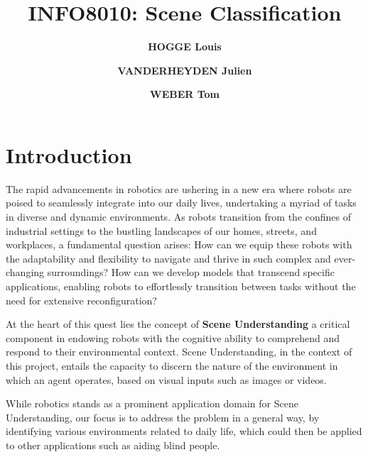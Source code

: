 \documentclass[twocolumn,superscriptaddress,aps]{revtex4-1}
\begin{document}

\title{\Large{INFO8010: Scene Classification}}
\vspace{1cm}
\author{\small{\bf HOGGE Louis}}
\author{\small{\bf VANDERHEYDEN Julien}}
\author{\small{\bf WEBER Tom}}

\maketitle


\section{Introduction}

The rapid advancements in robotics are ushering in a new era where robots are poised to seamlessly integrate into our daily lives, undertaking a myriad of tasks in diverse and dynamic environments. As robots transition from the confines of industrial settings to the bustling landscapes of our homes, streets, and workplaces, a fundamental question arises: How can we equip these robots with the adaptability and flexibility to navigate and thrive in such complex and ever-changing surroundings? How can we develop models that transcend specific applications, enabling robots to effortlessly transition between tasks without the need for extensive reconfiguration?

At the heart of this quest lies the concept of \textbf{Scene Understanding} a critical component in endowing robots with the cognitive ability to comprehend and respond to their environmental context. Scene Understanding, in the context of this project, entails the capacity to discern the nature of the environment in which an agent operates, based on visual inputs such as images or videos.

While robotics stands as a prominent application domain for Scene Understanding, our focus is to address the problem in a general way, by identifying various environments related to daily life, which could then be applied to other applications such as aiding blind people.
\end{document}
